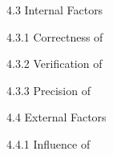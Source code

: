 
4.3 Internal Factors

4.3.1 Correctness of

4.3.2 Verification of

4.3.3 Precision of


4.4 External Factors

4.4.1 Influence of 

